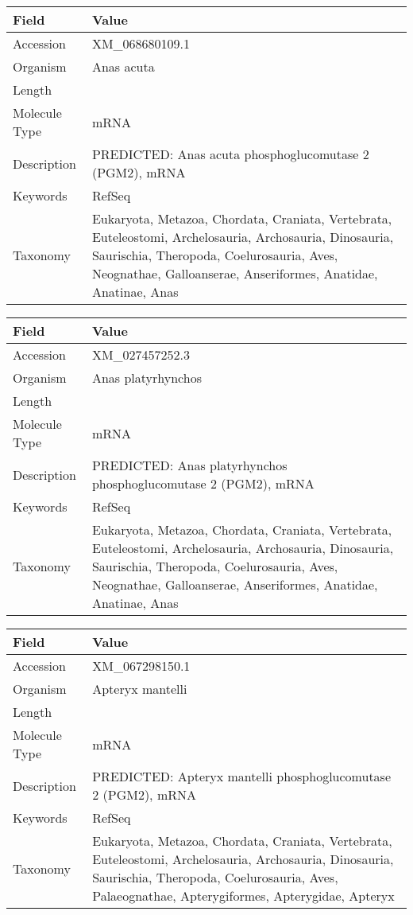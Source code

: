 \documentclass[10pt]{article}
\begin{document}
\vspace{1em}
{\footnotesize
\begin{longtable}{>{\raggedright\arraybackslash}p{4.5cm} >{\raggedright\arraybackslash}p{11.5cm}}
\textbf{Field} & \textbf{Value} \\
\hline
Accession & XM\_068680109.1 \\
Organism & Anas acuta \\
Length & 2435 \\
Molecule Type & mRNA \\
Description & PREDICTED: Anas acuta phosphoglucomutase 2 (PGM2), mRNA \\
Keywords & RefSeq \\
Taxonomy & Eukaryota, Metazoa, Chordata, Craniata, Vertebrata, Euteleostomi, Archelosauria, Archosauria, Dinosauria, Saurischia, Theropoda, Coelurosauria, Aves, Neognathae, Galloanserae, Anseriformes, Anatidae, Anatinae, Anas \\
\end{longtable}
}

\vspace{1em}
{\footnotesize
\begin{longtable}{>{\raggedright\arraybackslash}p{4.5cm} >{\raggedright\arraybackslash}p{11.5cm}}
\textbf{Field} & \textbf{Value} \\
\hline
Accession & XM\_027457252.3 \\
Organism & Anas platyrhynchos \\
Length & 2438 \\
Molecule Type & mRNA \\
Description & PREDICTED: Anas platyrhynchos phosphoglucomutase 2 (PGM2), mRNA \\
Keywords & RefSeq \\
Taxonomy & Eukaryota, Metazoa, Chordata, Craniata, Vertebrata, Euteleostomi, Archelosauria, Archosauria, Dinosauria, Saurischia, Theropoda, Coelurosauria, Aves, Neognathae, Galloanserae, Anseriformes, Anatidae, Anatinae, Anas \\
\end{longtable}
}

\vspace{1em}
{\footnotesize
\begin{longtable}{>{\raggedright\arraybackslash}p{4.5cm} >{\raggedright\arraybackslash}p{11.5cm}}
\textbf{Field} & \textbf{Value} \\
\hline
Accession & XM\_067298150.1 \\
Organism & Apteryx mantelli \\
Length & 2003 \\
Molecule Type & mRNA \\
Description & PREDICTED: Apteryx mantelli phosphoglucomutase 2 (PGM2), mRNA \\
Keywords & RefSeq \\
Taxonomy & Eukaryota, Metazoa, Chordata, Craniata, Vertebrata, Euteleostomi, Archelosauria, Archosauria, Dinosauria, Saurischia, Theropoda, Coelurosauria, Aves, Palaeognathae, Apterygiformes, Apterygidae, Apteryx \\
\end{longtable}
}
\end{document}
